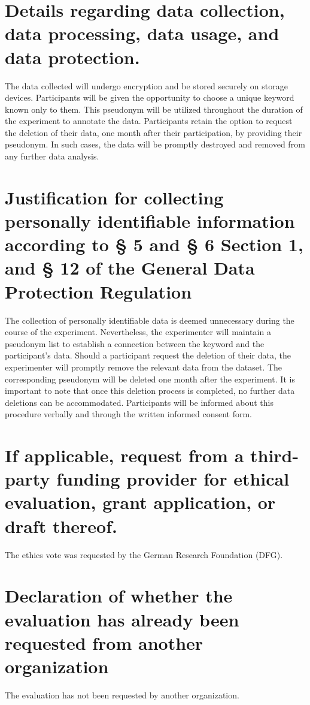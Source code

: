 \documentclass[letterpaper]{article}
\begin{document}
\section{Details regarding data collection, data processing, data usage, and data protection.}
The data collected will undergo encryption and be stored securely on storage devices. Participants will be given the opportunity to choose a unique keyword known only to them. This pseudonym will be utilized throughout the duration of the experiment to annotate the data. Participants retain the option to request the deletion of their data, one month after their participation, by providing their pseudonym. In such cases, the data will be promptly destroyed and removed from any further data analysis.

\section{Justification for collecting personally identifiable information according to {\S} 5 and {\S} 6 Section 1, and {\S} 12 of the General Data Protection Regulation}

The collection of personally identifiable data is deemed unnecessary during the course of the experiment. Nevertheless, the experimenter will maintain a pseudonym list to establish a connection between the keyword and the participant's data. Should a participant request the deletion of their data, the experimenter will promptly remove the relevant data from the dataset. The corresponding pseudonym will be deleted one month after the experiment. It is important to note that once this deletion process is completed, no further data deletions can be accommodated. Participants will be informed about this procedure verbally and through the written informed consent form.

\section{If applicable, request from a third-party funding provider for ethical evaluation, grant application, or draft
thereof.}
The ethics vote was requested by the German Research Foundation (DFG).

\section{Declaration of whether the evaluation has already been requested from another organization}
The evaluation has not been requested by another organization.
\end{document}
